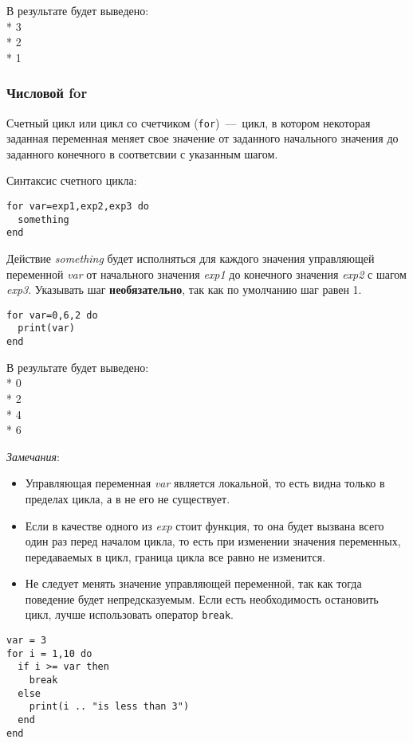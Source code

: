 В результате будет выведено:
\\* 3
\\* 2
\\* 1

\subsubsection{Числовой for}
Счетный цикл или цикл со счетчиком (\lstinline{for})~---~цикл, в котором некоторая заданная переменная меняет свое значение от заданного начального значения до заданного конечного в соответсвии с указанным шагом. 

Синтаксис счетного цикла: 
\begin{lstlisting}
for var=exp1,exp2,exp3 do
  something
end
\end{lstlisting}

Действие \emph{something} будет исполняться для каждого значения управляющей переменной \emph{var} от начального значения \emph{exp1} до конечного значения \emph{exp2} с шагом \emph{exp3}. Указывать шаг \textbf{необязательно}, так как по умолчанию шаг равен 1.

\begin{lstlisting}
for var=0,6,2 do
  print(var) 
end
\end{lstlisting}

В результате будет выведено:
\\* 0
\\* 2
\\* 4
\\* 6

\emph{Замечания}:
\begin{itemize}
	\item Управляющая переменная \emph{var} является локальной, то есть видна только в пределах цикла, а в не его не существует.
	\item Если в качестве одного из \emph{exp} стоит функция, то она будет вызвана всего один раз перед началом цикла, то есть при изменении значения переменных, передаваемых в цикл, граница цикла все равно не изменится. 
	\item Не следует менять значение управляющей переменной, так как тогда поведение будет непредсказуемым. Если есть необходимость остановить цикл, лучше использовать оператор \lstinline{break}.
\end{itemize}

		   
\begin{lstlisting}
var = 3
for i = 1,10 do
  if i >= var then
    break
  else
    print(i .. "is less than 3")
  end
end
\end{lstlisting}

